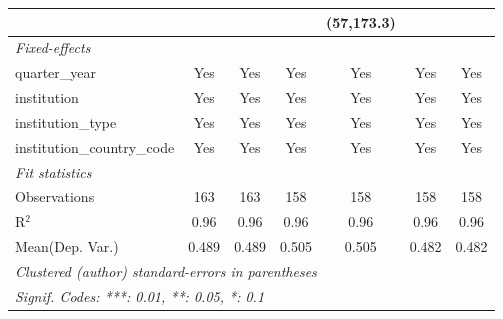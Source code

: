 \begin{tabular}{lcccccc}
                                      &                &             &        & (57,173.3)  &                &   \\   
   \midrule
   \emph{Fixed-effects}\\
   quarter\_year                      & Yes            & Yes         & Yes    & Yes         & Yes            & Yes\\  
   institution                        & Yes            & Yes         & Yes    & Yes         & Yes            & Yes\\  
   institution\_type                  & Yes            & Yes         & Yes    & Yes         & Yes            & Yes\\  
   institution\_country\_code         & Yes            & Yes         & Yes    & Yes         & Yes            & Yes\\  
   \midrule
   \emph{Fit statistics}\\
   Observations                       & 163            & 163         & 158    & 158         & 158            & 158\\  
   R$^2$                              & 0.96           & 0.96        & 0.96   & 0.96        & 0.96           & 0.96\\  
Mean(Dep. Var.) & 0.489 & 0.489 & 0.505 & 0.505 & 0.482 & 0.482 \\
   \midrule \midrule
   \multicolumn{7}{l}{\emph{Clustered (author) standard-errors in parentheses}}\\
   \multicolumn{7}{l}{\emph{Signif. Codes: ***: 0.01, **: 0.05, *: 0.1}}\\
\end{tabular}
\par\endgroup
